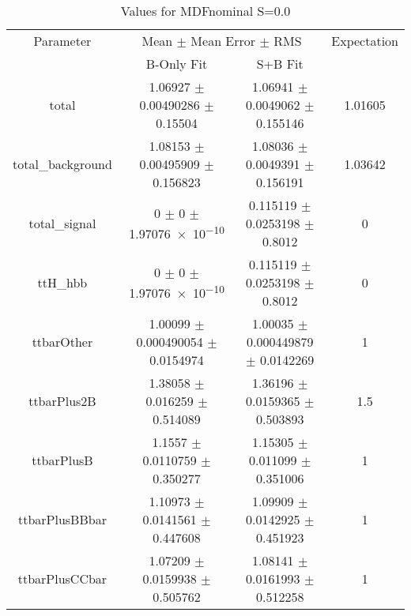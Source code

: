 \begin{table}
\centering
\caption{Values for MDFnominal S=0.0}
\begin{tabular}{cccc}
\toprule
Parameter & \multicolumn{2}{c}{Mean $\pm$ Mean Error $\pm$ RMS} & Expectation\\
 & B-Only Fit & S+B Fit & \\
\midrule
total & \num{1.06927} $\pm$ \num{0.00490286} $\pm$ \num{0.15504} & \num{1.06941} $\pm$ \num{0.0049062} $\pm$ \num{0.155146} & \num{1.01605}\\
total\_background & \num{1.08153} $\pm$ \num{0.00495909} $\pm$ \num{0.156823} & \num{1.08036} $\pm$ \num{0.0049391} $\pm$ \num{0.156191} & \num{1.03642}\\
total\_signal & \num{0} $\pm$ \num{0} $\pm$ \num{1.97076e-10} & \num{0.115119} $\pm$ \num{0.0253198} $\pm$ \num{0.8012} & \num{0}\\
ttH\_hbb & \num{0} $\pm$ \num{0} $\pm$ \num{1.97076e-10} & \num{0.115119} $\pm$ \num{0.0253198} $\pm$ \num{0.8012} & \num{0}\\
ttbarOther & \num{1.00099} $\pm$ \num{0.000490054} $\pm$ \num{0.0154974} & \num{1.00035} $\pm$ \num{0.000449879} $\pm$ \num{0.0142269} & \num{1}\\
ttbarPlus2B & \num{1.38058} $\pm$ \num{0.016259} $\pm$ \num{0.514089} & \num{1.36196} $\pm$ \num{0.0159365} $\pm$ \num{0.503893} & \num{1.5}\\
ttbarPlusB & \num{1.1557} $\pm$ \num{0.0110759} $\pm$ \num{0.350277} & \num{1.15305} $\pm$ \num{0.011099} $\pm$ \num{0.351006} & \num{1}\\
ttbarPlusBBbar & \num{1.10973} $\pm$ \num{0.0141561} $\pm$ \num{0.447608} & \num{1.09909} $\pm$ \num{0.0142925} $\pm$ \num{0.451923} & \num{1}\\
ttbarPlusCCbar & \num{1.07209} $\pm$ \num{0.0159938} $\pm$ \num{0.505762} & \num{1.08141} $\pm$ \num{0.0161993} $\pm$ \num{0.512258} & \num{1}\\
\bottomrule
\end{tabular}
\end{table}